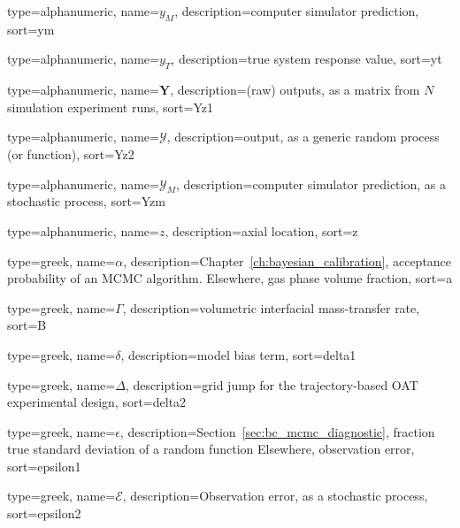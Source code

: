 {
  type=alphanumeric,
	name={\ensuremath{y_M}},
	description={computer simulator prediction},
	sort={ym}
}

{
  type=alphanumeric,
	name={\ensuremath{y_T}},
	description={true system response value},
	sort={yt}
}

{
  type=alphanumeric,
	name={\ensuremath{\mathbf{Y}}},
	description={(raw) outputs, as a matrix from $N$ simulation experiment runs},
	sort={Yz1}
}

{
  type=alphanumeric,
	name={\ensuremath{\mathcal{Y}}},
	description={output, as a generic random process (or function)},
	sort={Yz2}
}

{
  type=alphanumeric,
	name={\ensuremath{\mathcal{Y}_M}},
	description={computer simulator prediction, as a stochastic process},
	sort={Yzm}
}

{
  type=alphanumeric,
	name={\ensuremath{z}},
	description={axial location},
	sort={z}
}


{
  type=greek,
	name={\ensuremath{\alpha}},
	description={Chapter~\ref{ch:bayesian_calibration}, acceptance probability of an MCMC algorithm. \newline Elsewhere, gas phase volume fraction},
	sort={a}
}	

{
  type=greek,
	name={\ensuremath{\Gamma}},
	description={volumetric interfacial mass-transfer rate},
	sort={B}
}

{
  type=greek,
	name={\ensuremath{\delta}},
	description={model bias term},
	sort={delta1}
}

{
  type=greek,
	name={\ensuremath{\Delta}},
	description={grid jump for the trajectory-based OAT experimental design},
	sort={delta2}
}

{
  type=greek,
	name={\ensuremath{\epsilon}},
	description={Section~\ref{sec:bc_mcmc_diagnostic}, fraction true standard deviation of a random function \newline Elsewhere, observation error},
	sort={epsilon1}
}

{
  type=greek,
	name={\ensuremath{\mathcal{E}}},
	description={Observation error, as a stochastic process},
	sort={epsilon2}
}

